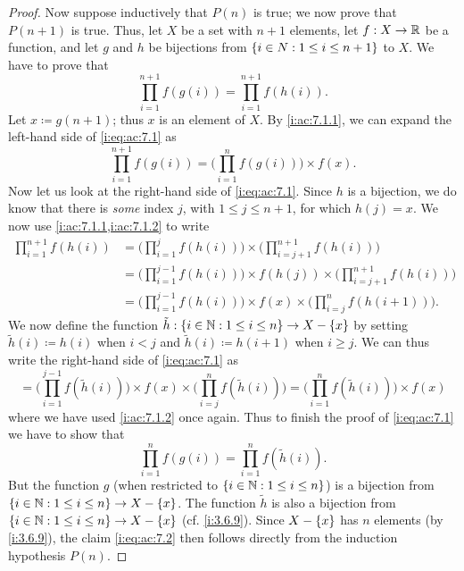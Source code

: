 \begin{proof}
  Now suppose inductively that \(P(n)\) is true;
  we now prove that \(P(n + 1)\) is true.
  Thus, let \(X\) be a set with \(n + 1\) elements, let \(f : X \to \mathbb{R}\) be a function, and let \(g\) and \(h\) be bijections from \(\left\lbrace i \in N : 1 \leq i \leq n + 1\right\rbrace\) to \(X\).
  We have to prove that
  \[
    \prod_{i = 1}^{n + 1} f(g(i)) = \prod_{i = 1}^{n + 1} f(h(i)). \tag{i:ac:7.1}\label{i:eq:ac:7.1}
  \]
  Let \(x \coloneqq g(n + 1)\);
  thus \(x\) is an element of \(X\).
  By \cref{i:ac:7.1.1}, we can expand the left-hand side of \cref{i:eq:ac:7.1} as
  \[
    \prod_{i = 1}^{n + 1} f(g(i)) = \Bigg(\prod_{i = 1}^n f(g(i))\Bigg) \times f(x).
  \]
  Now let us look at the right-hand side of \cref{i:eq:ac:7.1}.
  Since \(h\) is a bijection, we do know that there is \emph{some} index \(j\), with \(1 \leq j \leq n + 1\), for which \(h(j) = x\).
  We now use \cref{i:ac:7.1.1,i:ac:7.1.2} to write
  \begin{align*}
    \prod_{i = 1}^{n + 1} f(h(i)) & = \Bigg(\prod_{i = 1}^j f(h(i))\Bigg) \times \Bigg(\prod_{i = j + 1}^{n + 1} f(h(i))\Bigg)                      \\
                                  & = \Bigg(\prod_{i = 1}^{j - 1} f(h(i))\Bigg) \times f(h(j)) \times \Bigg(\prod_{i = j + 1}^{n + 1} f(h(i))\Bigg) \\
                                  & = \Bigg(\prod_{i = 1}^{j - 1} f(h(i))\Bigg) \times f(x) \times \Bigg(\prod_{i = j}^n f(h(i + 1))\Bigg).
  \end{align*}
  We now define the function \(\tilde{h} : \left\lbrace i \in \mathbb{N} : 1 \leq i \leq n\right\rbrace \to X - \left\lbrace x\right\rbrace\) by setting \(\tilde{h}(i) \coloneqq h(i)\) when \(i < j\) and \(\tilde{h}(i) \coloneqq h(i + 1)\) when \(i \geq j\).
  We can thus write the right-hand side of \cref{i:eq:ac:7.1} as
  \[
    = \Bigg(\prod_{i = 1}^{j - 1} f(\tilde{h}(i))\Bigg) \times f(x) \times \Bigg(\prod_{i = j}^n f(\tilde{h}(i))\Bigg) = \Bigg(\prod_{i = 1}^n f(\tilde{h}(i))\Bigg) \times f(x)
  \]
  where we have used \cref{i:ac:7.1.2} once again.
  Thus to finish the proof of \cref{i:eq:ac:7.1} we have to show that
  \[
    \prod_{i = 1}^n f(g(i)) = \prod_{i = 1}^n f(\tilde{h}(i)). \tag{i:ac:7.2}\label{i:eq:ac:7.2}
  \]
  But the function \(g\) (when restricted to \(\left\lbrace i \in \mathbb{N} : 1 \leq i \leq n\right\rbrace\)) is a bijection from \(\left\lbrace i \in \mathbb{N} : 1 \leq i \leq n\right\rbrace \to X - \left\lbrace x\right\rbrace\).
  The function \(\tilde{h}\) is also a bijection from \(\left\lbrace i \in \mathbb{N} : 1 \leq i \leq n\right\rbrace \to X - \left\lbrace x\right\rbrace\) (cf. \cref{i:3.6.9}).
  Since \(X - \left\lbrace x\right\rbrace\) has \(n\) elements (by \cref{i:3.6.9}), the claim \cref{i:eq:ac:7.2} then follows directly from the induction hypothesis \(P(n)\).
\end{proof}

